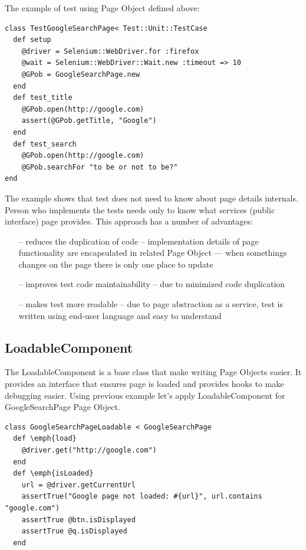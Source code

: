 \documentclass[12pt,twoside]{article}
\begin{document}
The example of test using Page Object defined above:
\begin{verbatim}
class TestGoogleSearchPage< Test::Unit::TestCase
  def setup
    @driver = Selenium::WebDriver.for :firefox
    @wait = Selenium::WebDriver::Wait.new :timeout => 10
    @GPob = GoogleSearchPage.new
  end
  def test_title
    @GPob.open(http://google.com)
    assert(@GPob.getTitle, "Google")
  end
  def test_search
    @GPob.open(http://google.com)
    @GPob.searchFor "to be or not to be?"
end
\end{verbatim}
The example shows that test does not need to know about page details internals. Person who implements the tests needs only to know what services (public interface) page provides.
This approach has a number of advantages:
\begin{itemize}
\item [--] reduces the duplication of code -- implementation details of page functionality are encapsulated in related Page Object --- when somethings changes on the page there is only one place to update
\item [--] improves test code maintainability -- due to minimized code duplication
\item [--] makes test more readable -- due to page abstraction as a service, test is written using end-user language and easy to understand
\end{itemize}


\subsection{LoadableComponent}
The LoadableComponent is a base class that make writing Page Objects easier. It provides an interface that ensures page is loaded and provides hooks to make debugging easier. 
Using previous example let's apply LoadableComponent for GoogleSearchPage Page Object. 

\begin{verbatim}
class GoogleSearchPageLoadable < GoogleSearchPage
  def \emph{load}
    @driver.get("http://google.com")
  end
  def \emph{isLoaded}
    url = @driver.getCurrentUrl
    assertTrue("Google page not loaded: #{url}", url.contains "google.com")  
    assertTrue @btn.isDisplayed
    assertTrue @q.isDisplayed
  end
\end{verbatim}
\end{document}
